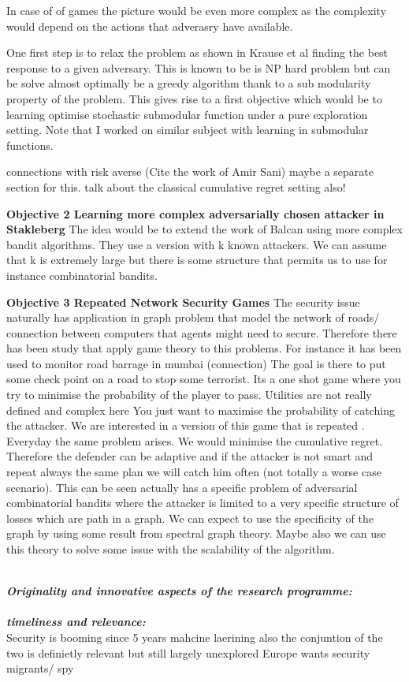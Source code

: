 In case of of games the picture would be even more complex as the complexity would depend on the actions that adverasry have available.

One first step is to relax the problem as shown in Krause et al finding the best response to a given adversary. This is known to be is NP hard problem  but can be solve almost optimally be a greedy algorithm thank to a sub modularity property of the problem. This gives rise to a first objective which would be to learning optimise stochastic submodular function under a pure exploration setting.
Note that I worked on similar subject with learning in submodular functions.

connections with risk averse (Cite the work of Amir Sani) maybe a separate section for this.
talk about the classical cumulative regret setting also!

\textbf{Objective 2 Learning  more complex adversarially chosen attacker in  Stakleberg}
The idea would be to  extend the work of Balcan using more complex bandit algorithms. They use a version with k known attackers. We can assume that k is extremely large but there is some  structure that permits us to use for instance combinatorial bandits.



\textbf{Objective 3 Repeated Network Security Games}
The security issue naturally has application in graph problem that model the network of roads/ connection between computers that agents might need to secure. Therefore there has been study that apply game theory to this problems. For instance it has been used to monitor road barrage in mumbai (connection) The goal is there to put some check point on a road to stop some terrorist. Its a one shot game where you try to minimise the probability of the player to pass.  Utilities are not really defined and complex here You just want to maximise the probability of catching the attacker. We are interested in a version of this game that is repeated . Everyday the same problem arises. We would minimise the cumulative regret. Therefore the defender can be adaptive and if the attacker is not smart and repeat always the same plan we will catch him often (not totally a worse case scenario). This can be seen actually has a specific problem of adversarial combinatorial bandits where the  attacker is limited to a very specific structure of losses which are path in a graph. We can expect to use the specificity of the graph by using some result from spectral graph theory. Maybe also we can use this theory to solve some issue with the scalability of the algorithm.



\noindent \textbf{\textit{\\Originality and innovative aspects of the research programme:}}\\

 
\noindent \textbf{\textit{\\timeliness and relevance:}}\\
Security is booming since 5 years
mahcine laerining also
the conjuntion of the two is definietly relevant but still largely unexplored
Europe wants security
migrants/ spy
 